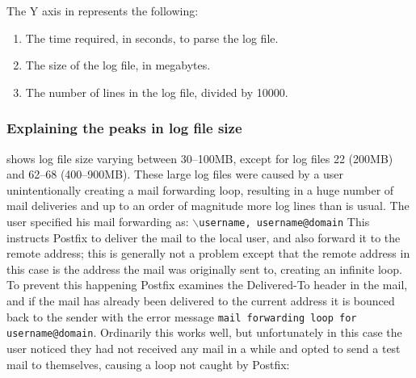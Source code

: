 The Y axis in  represents the following:

\begin{enumerate}

    \item The time required, in seconds, to parse the log file.

    \item The size of the log file, in megabytes.

    \item The number of lines in the log file, divided by 10000.

\end{enumerate}



\subsubsection{Explaining the peaks in log file size}

\label{Explaining the peaks in log file size}

 shows log
file size varying between 30--100MB, except for log files 22 (200MB) and
62--68 (400--900MB).  These large log files were caused by a user
unintentionally creating a mail forwarding loop, resulting in a huge number
of mail deliveries and up to an order of magnitude more log lines than is
usual.  The user specified his mail forwarding as: \newline
\tab{}\texttt{$\backslash$username, username@domain} \newline This
instructs Postfix to deliver the mail to the local user, and also forward
it to the remote address; this is generally not a problem except that the
remote address in this case is the address the mail was originally sent to,
creating an infinite loop.  To prevent this happening Postfix examines the
Delivered-To header in the mail, and if the mail has already been delivered
to the current address it is bounced back to the sender with the error
message \texttt{mail forwarding loop for username@domain}.  Ordinarily this
works well, but unfortunately in this case the user noticed they had not
received any mail in a while and opted to send a test mail to themselves,
causing a loop not caught by Postfix:

